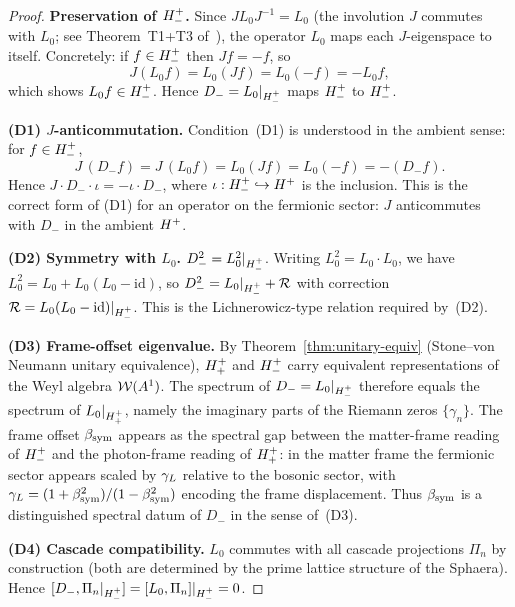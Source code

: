 \begin{proof}
\textbf{Preservation of $H^+_-$.}
Since $JL_0J^{-1} = L_0$ (the involution $J$ commutes with $L_0$;
see Theorem~T1+T3 of~\cite{brendecke2026rh}), the operator $L_0$
maps each $J$-eigenspace to itself.
Concretely: if $f\in H^+_-$ then $Jf = -f$, so
\[
 J(L_0 f) = L_0(Jf) = L_0(-f) = -L_0 f,
\]
which shows $L_0 f\in H^+_-$.
Hence $D_{-} = L_0|_{H^+_-}$ maps $H^+_-$ to $H^+_-$.

\smallskip
\noindent\textbf{(D1) $J$-anticommutation.}
Condition~(D1) is understood in the ambient sense: for $f\in H^+_-$,
\[
 J\,(D_{-}f) = J\,(L_0 f) = L_0(Jf) = L_0(-f) = -(D_{-}f).
\]
Hence $J\cdot D_{-}\cdot\iota = -\iota\cdot D_{-}$, where
$\iota:H^+_-\hookrightarrow H^+$ is the inclusion.
This is the correct form of (D1) for an operator on the fermionic
sector: $J$ anticommutes with $D_{-}$ in the ambient $H^+$.

\smallskip
\noindent\textbf{(D2) Symmetry with $L_0$.}
$D_{-}^2 = L_0^2|_{H^+_-}$.
Writing $L_0^2 = L_0\cdot L_0$, we have
$L_0^2 = L_0 + L_0(L_0-\mathrm{id})$,
so $D_{-}^2 = L_0|_{H^+_-} + \mathcal{R}$ with correction
$\mathcal{R} = L_0(L_0-\mathrm{id})|_{H^+_-}$.
This is the Lichnerowicz-type relation required by~(D2).

\smallskip
\noindent\textbf{(D3) Frame-offset eigenvalue.}
By Theorem~\ref{thm:unitary-equiv} (Stone--von Neumann unitary
equivalence), $H^+_+$ and $H^+_-$ carry equivalent
representations of the Weyl algebra $\mathcal{W}(A^1)$.
The spectrum of $D_{-} = L_0|_{H^+_-}$ therefore equals the
spectrum of $L_0|_{H^+_+}$, namely the imaginary parts of the
Riemann zeros $\{\gamma_n\}$.
The frame offset $\beta_{\mathrm{sym}}$ appears as the spectral gap between the
matter-frame reading of $H^+_-$ and the photon-frame reading
of $H^+_+$: in the matter frame the fermionic sector appears
scaled by $\gamma_L$ relative to the bosonic sector, with
$\gamma_L = (1+\beta_{\mathrm{sym}}^2)/(1-\beta_{\mathrm{sym}}^2)$ encoding the frame displacement.
Thus $\beta_{\mathrm{sym}}$ is a distinguished spectral datum of $D_{-}$ in the
sense of~(D3).

\smallskip
\noindent\textbf{(D4) Cascade compatibility.}
$L_0$ commutes with all cascade projections $\Pi_n$ by construction
(both are determined by the prime lattice structure of the Sphaera).
Hence $[D_{-},\Pi_n|_{H^+_-}] = [L_0,\Pi_n]|_{H^+_-} = 0$.
\end{proof}

